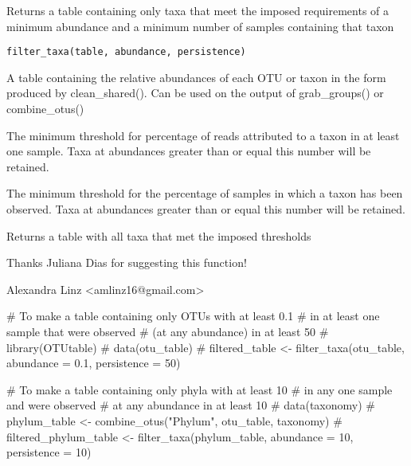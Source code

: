 \documentclass[a4paper]{book}
\begin{document}
%
\begin{Description}\relax
Returns a table containing only taxa that meet the imposed requirements of a minimum abundance and a minimum number of samples containing that taxon
\end{Description}
%
\begin{Usage}
\begin{verbatim}
filter_taxa(table, abundance, persistence)
\end{verbatim}
\end{Usage}
%
\begin{Arguments}
\begin{ldescription}
\item[\code{table}] 
A table containing the relative abundances of each OTU or taxon in the form produced by clean\_shared(). Can be used on the output of grab\_groups() or combine\_otus()

\item[\code{abundance}] 
The minimum threshold for percentage of reads attributed to a taxon in at least one sample. Taxa at abundances greater than or equal this number will be retained.

\item[\code{persistence}] 
The minimum threshold for the percentage of samples in which a taxon has been observed.  Taxa at abundances greater than or equal this number will be retained.

\end{ldescription}
\end{Arguments}
%
\begin{Value}
Returns a table with all taxa that met the imposed thresholds
\end{Value}
%
\begin{Note}\relax
Thanks Juliana Dias for suggesting this function!

\end{Note}
%
\begin{Author}\relax
Alexandra Linz <amlinz16@gmail.com>
\end{Author}
%
\begin{Examples}
\begin{ExampleCode}

# To make a table containing only OTUs with at least 0.1%
# in at least one sample that were observed 
# (at any abundance) in at least 50%
# library(OTUtable)
# data(otu_table)
# filtered_table <- filter_taxa(otu_table, abundance = 0.1, persistence = 50)

# To make a table containing only phyla with at least 10%
# in any one sample and were observed 
# at any abundance in at least 10%
# data(taxonomy)
# phylum_table <- combine_otus("Phylum", otu_table, taxonomy)
# filtered_phylum_table <- filter_taxa(phylum_table, abundance = 10, persistence = 10)
\end{ExampleCode}
\end{Examples}
\end{document}
